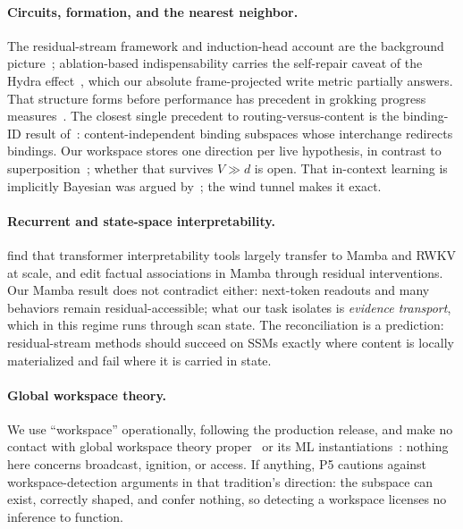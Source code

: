 \documentclass[11pt]{article}
\begin{document}
\paragraph{Circuits, formation, and the nearest neighbor.} The
residual-stream framework and induction-head account are the
background picture~\citep{elhage2021framework, olsson2022induction};
ablation-based indispensability carries the self-repair caveat of the
Hydra effect~\citep{mcgrath2023hydra}, which our absolute
frame-projected write metric partially answers. That structure forms
before performance has precedent in grokking progress
measures~\citep{nanda2023grokking}. The closest single precedent to
routing-versus-content is the binding-ID result
of~\citet{feng2023binding}: content-independent binding subspaces
whose interchange redirects bindings. Our workspace stores one
direction per live hypothesis, in contrast to
superposition~\citep{elhage2022superposition}; whether that survives
$V \gg d$ is open. That in-context learning is implicitly Bayesian was
argued by~\citet{xie2022bayesian}; the wind tunnel makes it exact.

\paragraph{Recurrent and state-space interpretability.}
\citet{paulo2024rnns} find that transformer interpretability tools
largely transfer to Mamba and RWKV at scale, and \citet{sharma2024mamba}
edit factual associations in Mamba through residual interventions. Our
Mamba result does not contradict either: next-token readouts and many
behaviors remain residual-accessible; what our task isolates is
\emph{evidence transport}, which in this regime runs through scan
state. The reconciliation is a prediction: residual-stream methods
should succeed on SSMs exactly where content is locally materialized
and fail where it is carried in state.

\paragraph{Global workspace theory.} We use ``workspace''
operationally, following the production release, and make no contact
with global workspace theory
proper~\citep{baars1988cognitive, dehaene2011workspace} or its ML
instantiations~\citep{goyal2022workspace, vanrullen2021workspace}:
nothing here concerns broadcast, ignition, or access. If anything, P5
cautions against workspace-detection arguments in that tradition's
direction: the subspace can exist, correctly shaped, and confer
nothing, so detecting a workspace licenses no inference to function.
\end{document}
